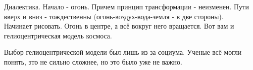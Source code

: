 Диалектика.
Начало - огонь. Причем принцип трансформации - неизменен. Пути вверх и вниз - тождественны (огонь-воздух-вода-земля - в две стороны). Начинает рисовать. Огонь в центре, а всё вокруг него вращается. Вот вам и гелиоцентрическая модель космоса.

Выбор гелиоцентрической модели был лишь из-за социума. Ученые всё могли понять, это не сильно сложнее, но это было уже не важно.
